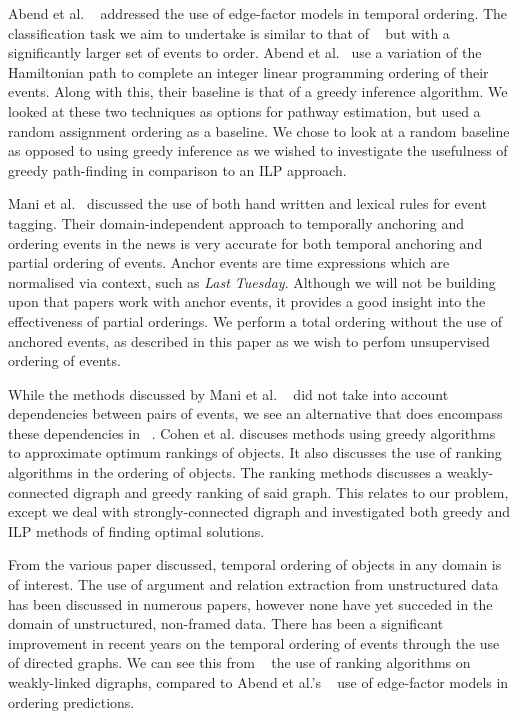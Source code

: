 \documentclass[bsc,frontabs,twoside,singlespacing,parskip,deptreport]{infthesis}     %
\begin{document}
Abend et al. ~\cite{abend2015lexical} addressed the use of
edge-factor models in temporal ordering. The classification task we aim to undertake is similar to that of ~\cite{abend2015lexical}
but with a significantly larger set of events to order.
Abend et al.~\cite{abend2015lexical} use a variation of the Hamiltonian path
to complete an integer linear programming ordering of their events. Along with this, their baseline is that of a greedy inference algorithm.
We looked at these two techniques as options for pathway estimation, but used a random assignment ordering as
a baseline. We chose to look at a random baseline as opposed to using greedy inference as
we wished to investigate the usefulness of greedy path-finding in comparison to an ILP approach.

Mani et al.~\cite{mani2006machine} discussed the use of both hand written and lexical rules for event tagging.
Their domain-independent approach to temporally anchoring and ordering events in the news is very accurate for both temporal
anchoring and partial ordering of events. Anchor events are time expressions which are normalised via
context, such as \textit{Last Tuesday}. Although we will not be building upon that papers work with
anchor events, it provides a good insight into the effectiveness of
partial orderings. We perform a total ordering without the use of anchored events, as described in this paper
as we wish to perfom unsupervised ordering of events.

While the methods discussed by Mani et al. ~\cite{mani2006machine} did not take into account dependencies between pairs of events, 
we see an alternative that does encompass
these dependencies in ~\cite{schapire1998learning}.
Cohen et al. discuses methods using greedy algorithms to approximate optimum rankings of objects.
It also discusses the use of ranking algorithms in the ordering of objects. The ranking methods discusses a
weakly-connected digraph and greedy ranking of said graph. This relates to our problem,
except we deal with strongly-connected digraph and investigated both greedy and ILP methods of finding
optimal solutions.


From the various paper discussed, temporal ordering of objects in any domain is of interest.
The use of argument and relation extraction from unstructured data has been discussed in numerous papers,
however none have yet succeded in the domain of unstructured, non-framed data.
There has been a significant improvement in recent years on the temporal ordering of events through the use of
directed graphs. We can see this from ~\cite{schapire1998learning} the use of ranking algorithms on weakly-linked
digraphs, compared to Abend et al.'s ~\cite{abend2015lexical} use of edge-factor models in ordering predictions. 
\end{document}
